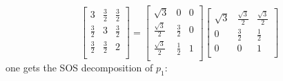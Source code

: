 \documentclass[nonacm]{acmart}
\begin{document}
\begin{equation*}
    \begin{bmatrix}
        3       & \frac32 & \frac32 \\
        \frac32 & 3       & \frac32 \\
        \frac32 & \frac32 & 2       \\
    \end{bmatrix}
    =
    \begin{bmatrix}
        \sqrt{3}           & 0       & 0 \\
        \frac{\sqrt{3}}{2} & \frac32 & 0 \\
        \frac{\sqrt{3}}{2} & \frac12 & 1 \\
    \end{bmatrix}
    \begin{bmatrix}
        \sqrt{3} & \frac{\sqrt{3}}{2} & \frac{\sqrt{3}}{2} \\
        0        & \frac32            & \frac12            \\
        0        & 0                  & 1                  \\
    \end{bmatrix}
\end{equation*}
one gets the SOS decomposition of $p_1$:
\end{document}
